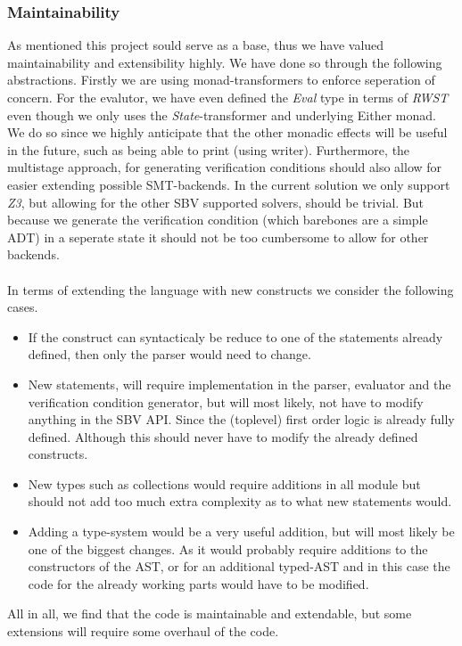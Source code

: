 \subsubsection{Maintainability}
As mentioned this project sould serve as a base, thus we have valued maintainability and extensibility highly. We have done so through the following abstractions. Firstly we are using monad-transformers to enforce seperation of concern. For the evalutor, we have even defined the \textit{Eval} type in terms of \textit{RWST} even though we only uses the \textit{State}-transformer and underlying Either monad. We do so since we highly anticipate that the other monadic effects will be useful in the future, such as being able to print (using writer).
Furthermore, the multistage approach, for generating verification conditions should also allow for easier extending possible SMT-backends.
In the current solution we only support \textit{Z3}, but allowing for the other SBV supported solvers, should be trivial.
But because we generate the verification condition (which barebones are a simple ADT) in a seperate state it should not be too cumbersome to allow for other backends.
\\~\\
In terms of extending the language with new constructs we consider the following cases.
\begin{itemize}
  \item If the construct can syntacticaly be reduce to one of the statements already defined, then only the parser would need to change.
  \item New statements, will require implementation in the parser, evaluator and the verification condition generator, but will most likely, not have to modify anything in the SBV API.
  Since the (toplevel) first order logic is already fully defined.
  Although this should never have to modify the already defined constructs.
  \item New types such as collections would require additions in all module but should not add too much extra complexity as to what new statements would.
  \item Adding a type-system would be a very useful addition, but will most likely be one of the biggest changes. As it would probably require additions to the constructors of the AST, or for an additional typed-AST and in this case the code for the already working parts would have to be modified.
\end{itemize}
All in all, we find that the code is maintainable and extendable, but some extensions will require some overhaul of the code.







